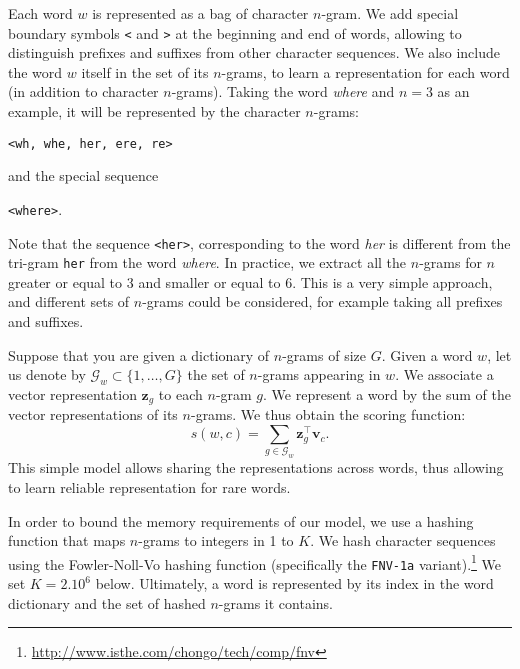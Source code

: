 Each word $w$ is represented as a bag of character $n$-gram.
We add special boundary symbols \texttt{<} and \texttt{>} at the beginning and end of words, allowing to distinguish prefixes and suffixes from other character sequences.
We also include the word $w$ itself in the set of its $n$-grams, to learn a representation for each word (in addition to character $n$-grams).
Taking the word \emph{where} and $n=3$ as an example, it will be represented by the character $n$-grams:
\begin{center}
\texttt{<wh, whe, her, ere, re>}
\end{center}
and the special sequence
\begin{center}
\texttt{<where>}.
\end{center}
Note that the sequence \texttt{<her>}, corresponding to the word \emph{her} is different from the tri-gram \texttt{her} from the word \emph{where}.
In practice, we extract all the $n$-grams for $n$ greater or equal to 3 and smaller or equal to $6$.
This is a very simple approach, and different sets of $n$-grams could be considered, for example taking all prefixes and suffixes.

Suppose that you are given a dictionary of $n$-grams of size $G$.
Given a word $w$, let us denote by $\mathcal{G}_w \subset \{1, \dots, G \}$ the set of $n$-grams appearing in $w$.
We associate a vector representation $\mathbf{z}_g$ to each $n$-gram $g$.
We represent a word by the sum of the vector representations of its $n$-grams.
We thus obtain the scoring function:
\begin{equation*}
s(w, c) = \sum_{g \in \mathcal{G}_w} \mathbf{z}_g^\top \mathbf{v}_c.
\end{equation*}
This simple model allows sharing the representations across words, thus allowing to learn reliable representation for rare words.

In order to bound the memory requirements of our model, we use a hashing function that maps $n$-grams to integers in 1 to $K$.
We hash character sequences using the Fowler-Noll-Vo hashing function (specifically the \texttt{FNV-1a} variant).\footnote{\smaller\relax\url{http://www.isthe.com/chongo/tech/comp/fnv}}
We set $K = 2.10^6$ below.
Ultimately, a word is represented by its index in the word dictionary and the set of hashed $n$-grams it contains.


